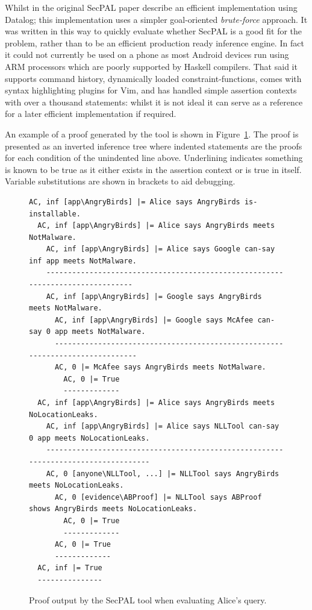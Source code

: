 \documentclass[a4paper,sfsidenotes]{tufte-book}
\begin{document}
Whilst in the original SecPAL paper\cite{Becker:2010vh}
\citeauthor*{Becker:2010vh} describe an efficient implementation using Datalog;
this implementation uses a simpler goal-oriented \emph{brute-force} approach.
It was written in this way to quickly evaluate whether SecPAL is a good fit for
the problem, rather than to be an efficient production ready inference
engine.  In fact it could not currently be used on a phone as most Android devices
run using ARM processors which are poorly supported by Haskell compilers.
That said it supports command history, dynamically loaded constraint-functions,
comes with syntax highlighting plugins for Vim, and has handled simple assertion
contexts with over a thousand statements: whilst it is not ideal it can serve as
a reference for a later efficient implementation if required.

An example of a proof generated by the tool is shown in
Figure~\ref{secpal:exampleproof}.  The proof is presented as an inverted
inference tree where indented statements are the proofs for each condition of
the unindented line above.  Underlining indicates something is known to be true
as it either exists in the assertion context or is true in itself. Variable
substitutions are shown in brackets to aid debugging.

\begin{figure}\label{secpal:exampleproof}
  \begin{lstlisting}[basicstyle=\small\ttfamily,columns=flexible,mathescape]
AC, inf [app\AngryBirds] |= Alice says AngryBirds is-installable.
  AC, inf [app\AngryBirds] |= Alice says AngryBirds meets NotMalware.
    AC, inf [app\AngryBirds] |= Alice says Google can-say inf app meets NotMalware.
    -------------------------------------------------------------------------------
    AC, inf [app\AngryBirds] |= Google says AngryBirds meets NotMalware.
      AC, inf [app\AngryBirds] |= Google says McAfee can-say 0 app meets NotMalware.
      ------------------------------------------------------------------------------
      AC, 0 |= McAfee says AngryBirds meets NotMalware.
        AC, 0 |= True
        -------------
  AC, inf [app\AngryBirds] |= Alice says AngryBirds meets NoLocationLeaks.
    AC, inf [app\AngryBirds] |= Alice says NLLTool can-say 0 app meets NoLocationLeaks.
    -----------------------------------------------------------------------------------
    AC, 0 [anyone\NLLTool, ...] |= NLLTool says AngryBirds meets NoLocationLeaks.
      AC, 0 [evidence\ABProof] |= NLLTool says ABProof shows AngryBirds meets NoLocationLeaks.
        AC, 0 |= True
        -------------
      AC, 0 |= True
      -------------
  AC, inf |= True
  ---------------
  \end{lstlisting}
  \caption{Proof output by the SecPAL tool when evaluating Alice's query.}
\end{figure}
\end{document}
